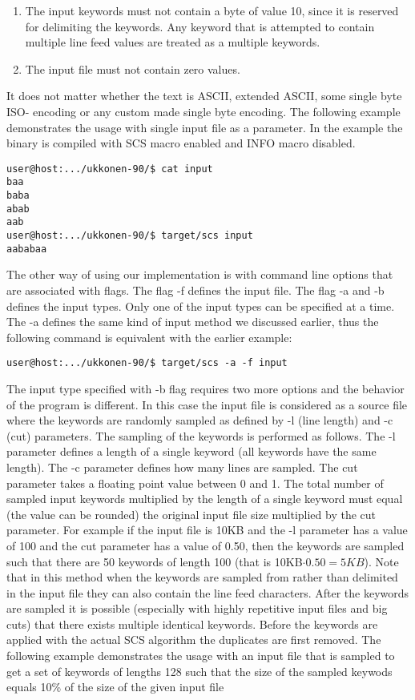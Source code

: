 \documentclass[english,twoside,censored,csm,algorithms-track-2020]{HYthesisML}
\theoremstyle{plain}
\theoremstyle{definition}
\begin{document}
\begin{enumerate}
\item The input keywords must not contain a byte of value 10, since it is reserved for delimiting the
  keywords. Any keyword that is attempted to contain multiple line feed values are treated as a multiple
  keywords.
\item The input file must not contain zero values.
\end{enumerate}

It does not matter whether the text is ASCII, extended ASCII, some single byte ISO- encoding or any
custom made single byte encoding. The following example demonstrates the usage with single input
file as a parameter. In the example the binary is compiled with SCS macro enabled and INFO macro
disabled.

\begin{verbatim}
user@host:.../ukkonen-90/$ cat input
baa
baba
abab
aab
user@host:.../ukkonen-90/$ target/scs input
aababaa
\end{verbatim}

The other way of using our implementation is with command line options that are associated with
flags. The flag -f defines the input file. The flag -a and -b defines the input types. Only one of the
input types can be specified at a time. The -a defines the same kind of input method we discussed
earlier, thus the following command is equivalent with the earlier example:

\begin{verbatim}
user@host:.../ukkonen-90/$ target/scs -a -f input
\end{verbatim}

The input type specified with -b flag requires two more options and the behavior of the program is
different. In this case the input file is considered as a source file where the keywords are randomly
sampled as defined by -l (line length) and -c (cut) parameters. The sampling of the keywords is
performed as follows. The -l parameter defines a length of a single keyword (all keywords have
the same length). The -c parameter defines how many lines are sampled. The cut parameter takes a
floating point value between 0 and 1. The total number of sampled input keywords multiplied by
the length of a single keyword must equal (the value can be rounded) the original input file size
multiplied by the cut parameter. For example if the input file is 10KB and the -l parameter has a value
of 100 and the cut parameter has a value of 0.50, then the keywords are sampled such that there
are 50 keywords of length 100 (that is 10KB$\cdot 0.50 = 5KB$). Note that in this method when the
keywords are sampled from rather than delimited in the input file they can also contain the line
feed characters. After the keywords are sampled it is possible (especially with highly repetitive
input files and big cuts) that there exists multiple identical keywords. Before the keywords are
applied with the actual SCS algorithm the duplicates are first removed. The following example
demonstrates the usage with an input file that is sampled to get a set of keywords of lengths 128
such that the size of the sampled keywods equals 10\% of the size of the given input file
\end{document}
